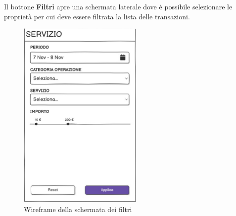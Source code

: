 Il bottone \textbf{Filtri} apre una schermata laterale dove \`e possibile selezionare le propriet\`a per cui deve essere filtrata la lista delle transazioni.

\begin{figure}[H]
  \centering
  \includegraphics[width=6cm]{images/gestione-wallet/mock-filtri-ricerca.png}
  \caption{Wireframe della schermata dei filtri}
\end{figure}

